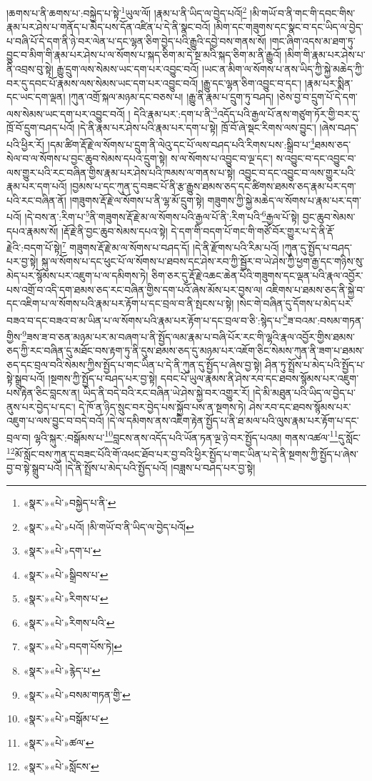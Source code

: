 །ཆགས་པ་ནི་ཆགས་པ་:བསྐྱེད་པ་སྟེ་\footnote{«སྣར་»«པེ་»བསྐྱེད་པ་ནི་}ཡུལ་ལོ། །རྣམ་པ་ནི་ཡིད་ལ་བྱེད་པའོ།\footnote{«སྣར་»«པེ་»པའོ། །མི་གཡོ་བ་ནི་ཡིད་ལ་བྱེད་པའོ།} །མི་གཡོ་བ་ནི་གང་གི་དབང་གིས་རྣམ་པར་ཤེས་པ་གནོད་པ་མེད་པས་དོན་འཛིན་པ་དེ་ནི་སྣང་བའོ། །མིག་དང་གཟུགས་དང་སྣང་བ་དང་ཡིད་ལ་བྱེད་པ་བཞི་པོ་དེ་དག་ནི་ཉེ་བར་ལེན་པ་དང་ལྷན་ཅིག་བྱེད་པའི་རྒྱུའི་དབྱེ་བས་གནས་སོ། །གང་ཞིག་འདས་མ་ཐག་ཏུ་བྱུང་བ་མིག་གི་རྣམ་པར་ཤེས་པ་ལ་སོགས་པ་སྐད་ཅིག་མ་དེ་སྔ་མའི་སྐད་ཅིག་མ་ནི་རྒྱུའོ། །མིག་གི་རྣམ་པར་ཤེས་པ་ནི་འབྲས་བུ་སྟེ། རྒྱུ་དྲུག་ལས་སེམས་ཡང་དག་པར་འབྱུང་བའོ། །ཡང་ན་མིག་ལ་སོགས་པ་ནས་ཡིད་ཀྱི་སྐྱེ་མཆེད་ཀྱི་བར་དུ་དབང་པོ་རྣམས་ལས་སེམས་ཡང་དག་པར་འབྱུང་བའོ། །རྒྱུ་དང་ལྷན་ཅིག་འབྱུང་བ་དང་། །རྣམ་པར་སྨིན་དང་ཡང་དག་ལྡན། །ཀུན་འགྲོ་སྐལ་མཉམ་དང་བཅས་པ། །རྒྱུ་ནི་རྣམ་པ་དྲུག་ཏུ་བཤད། །ཅེས་བྱ་བ་དྲུག་པོ་དེ་དག་ལས་སེམས་ཡང་དག་པར་འབྱུང་བའོ། །
དེའི་རྣམ་པར་:དག་པ་ནི་\footnote{«སྣར་»«པེ་»དག་པ་}འདོད་པའི་རྒྱལ་པོ་ནས་གཙུག་ཏོར་གྱི་བར་དུ་ཁྲོ་བོ་དྲུག་བཤད་པའོ། །དེ་ནི་རྣམ་པར་ཤེས་པའི་རྣམ་པར་དག་པ་སྟེ། ཁྲོ་བོ་ཞེ་སྡང་རིགས་ལས་བྱུང་། །ཞེས་བཤད་པའི་ཕྱིར་རོ། །དམ་ཚིག་རྡོ་རྗེ་ལ་སོགས་པ་དྲུག་ནི་ལེའུ་དང་པོ་ལས་བཤད་པའི་རིགས་པས་:སྒྲིབ་པ་\footnote{«སྣར་»«པེ་»སྒྲིབས་པ་}ཐམས་ཅད་སེལ་བ་ལ་སོགས་པ་བྱང་ཆུབ་སེམས་དཔའ་དྲུག་སྟེ། ས་ལ་སོགས་པ་འབྱུང་བ་ལྔ་དང་། ས་འབྱུང་བ་དང་འབྱུང་བ་ལས་གྱུར་པའི་རང་བཞིན་གྱིས་རྣམ་པར་ཤེས་པའི་ཁམས་ལ་གནས་པ་སྟེ། འབྱུང་བ་དང་འབྱུང་བ་ལས་གྱུར་པའི་རྣམ་པར་དག་པའོ། །བྱམས་པ་དང་ཀུན་དུ་བཟང་པོ་ནི་རྩ་རྒྱུས་ཐམས་ཅད་དང་ཚིགས་ཐམས་ཅད་རྣམ་པར་དག་པའི་རང་བཞིན་ནོ། །གཟུགས་རྡོ་རྗེ་ལ་སོགས་པ་ནི་ལྷ་མོ་དྲུག་སྟེ། གཟུགས་ཀྱི་སྐྱེ་མཆེད་ལ་སོགས་པ་རྣམ་པར་དག་པའོ། །དེ་བས་ན་:རིག་པ་\footnote{«སྣར་»«པེ་»རིགས་པ་}ནི་གཟུགས་རྡོ་རྗེ་མ་ལ་སོགས་པའི་རྒྱལ་པོ་ནི་:རིག་པའི་\footnote{«སྣར་»«པེ་»རིགས་པའི་}རྒྱལ་པོ་སྟེ། བྱང་ཆུབ་སེམས་དཔའ་རྣམས་སོ། །རྡོ་རྗེ་ནི་བྱང་ཆུབ་སེམས་དཔའ་སྟེ། དེ་དག་གི་བདག་པོ་གང་གི་གཙོ་བོར་གྱུར་པ་དེ་ནི་རྡོ་རྗེའི་:བདག་པོ་སྟེ།\footnote{«སྣར་»«པེ་»བདག་པོས་ཏེ།} གཟུགས་རྡོ་རྗེ་མ་ལ་སོགས་པ་བཤད་དོ། །དེ་ནི་རྫོགས་པའི་རིམ་པའོ། །ཀུན་དུ་སྤྱོད་པ་བཤད་པར་བྱ་སྟེ། སྐུ་ལ་སོགས་པ་དང་ཕུང་པོ་ལ་སོགས་པ་ཐབས་དང་ཤེས་རབ་ཀྱི་སྦྱོར་བ་ཡེ་ཤེས་ཀྱི་ཕྱག་རྒྱ་དང་གཉིས་སུ་མེད་པར་སྙོམས་པར་འཇུག་པ་ལ་དམིགས་ཏེ། ཅིག་ཅར་དུ་རྡོ་རྗེ་འཆང་ཆེན་པོའི་གཟུགས་དང་ལྡན་པའི་རྣལ་འབྱོར་པས་འགྲོ་བ་འདི་དག་ཐམས་ཅད་རང་བཞིན་གྱིས་དག་པའོ་ཞེས་མོས་པར་བྱས་ལ། འཇིགས་པ་ཐམས་ཅད་ནི་སྐྱེ་བ་དང་འཇིག་པ་ལ་སོགས་པའི་རྣམ་པར་རྟོག་པ་དང་བྲལ་བ་ནི་སྤངས་པ་སྟེ། །སེང་གེ་བཞིན་དུ་དོགས་པ་མེད་པར་བཟའ་བ་དང་བཟའ་བ་མ་ཡིན་པ་ལ་སོགས་པའི་རྣམ་པར་རྟོག་པ་དང་བྲལ་བ་ཅི་:སྙེད་པ་\footnote{«སྣར་»«པེ་»རྙེད་པ་}ཟ་བའམ་:བསམ་གཏན་གྱིས་\footnote{«སྣར་»«པེ་»བསམ་གཏན་གྱི་}ཟས་ཟ་བ་ཅན་མཉམ་པར་མ་བཞག་པ་ནི་སྤྱོད་ལམ་རྣམ་པ་བཞི་པོར་རང་གི་ལྷའི་རྣལ་འབྱོར་གྱིས་ཐམས་ཅད་ཀྱི་རང་བཞིན་དུ་མཐོང་བས་རྟག་ཏུ་ནི་དུས་ཐམས་ཅད་དུ་མཉམ་པར་འཇོག་ཅིང་སེམས་ཀུན་ནི་ཟག་པ་ཐམས་ཅད་དང་བྲལ་བའི་སེམས་ཀྱིས་སྤྱོད་པ་གང་ཡིན་པ་དེ་ནི་ཀུན་དུ་སྤྱོད་པ་ཞེས་བྱ་སྟེ། ཤིན་ཏུ་སྤྲོས་པ་མེད་པའི་སྤྱོད་པ་སྟེ་སྒྲུབ་པའོ། །སྔགས་ཀྱི་སྤྱོད་པ་བཤད་པར་བྱ་སྟེ། དབང་པོ་ཡུལ་རྣམས་ནི་ཤེས་རབ་དང་ཐབས་སྙོམས་པར་འཇུག་པས་རྟེན་ཅིང་བླངས་ན། ཡིད་ནི་བདེ་བའི་རང་བཞིན་ཡེ་ཤེས་སྐྱེ་བར་འགྱུར་རོ། །དེ་མི་མཐུན་པའི་ཡིད་ལ་བྱེད་པ་ནུས་པར་བྱེད་པ་དང་། དེ་ཁོ་ན་ཉིད་སྲུང་བར་བྱེད་པས་སྐྱོབ་པས་ན་སྔགས་ཏེ། ཤེས་རབ་དང་ཐབས་སྙོམས་པར་འཇུག་པ་ལས་བྱུང་བ་བདེ་བའོ། །དེ་ལ་དམིགས་ནས་འཇིག་རྟེན་སྤྱོད་པ་ནི་ཐ་མལ་པའི་ལུས་རྣམ་པར་རྟོག་པ་དང་བྲལ་བ། ལྷའི་སྐུར་:བསྒོམས་པ་\footnote{«སྣར་»«པེ་»བསྒོམ་པ་}བླངས་ནས་འདོད་པའི་ཡོན་ཏན་ལྔ་ཉེ་བར་སྤྱོད་པའམ། གནས་འཚལ་\footnote{«སྣར་»«པེ་»ཚལ་}དུ་སློང་\footnote{«སྣར་»«པེ་»སློངས་}མོ་སློང་བས་ཀུན་དུ་བཟང་པོའི་གོ་འཕང་ཐོབ་པར་བྱ་བའི་ཕྱིར་སྤྱོད་པ་གང་ཡིན་པ་དེ་ནི་སྔགས་ཀྱི་སྤྱོད་པ་ཞེས་བྱ་བ་སྟེ་སྒྲུབ་པའོ། །དེ་ནི་སྤྲོས་པ་མེད་པའི་སྤྱོད་པའོ། །བཟླས་པ་བཤད་པར་བྱ་སྟེ། 